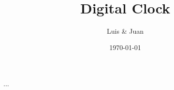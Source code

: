\documentclass{beamer}
\begin{document}
\title{Digital Clock}
\author{Luis \& Juan}
\date[\initclock\tdtime]{\today}
\maketitle
\begin{frame}
...
\end{frame}
\end{document}
